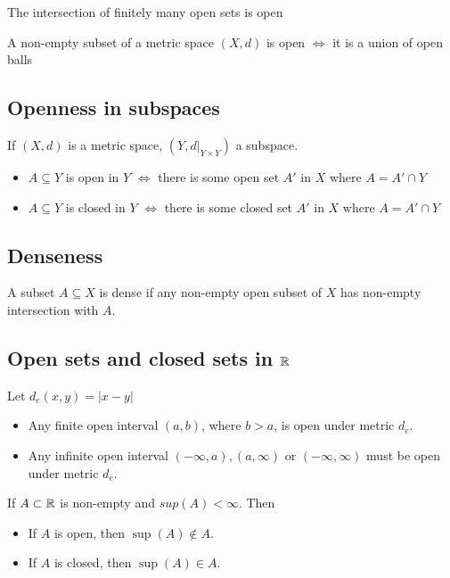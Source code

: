 \begin{theorem}
  The intersection of finitely many open sets is open
\end{theorem}

\begin{theorem}
  A non-empty subset of a metric space $(X, d)$ is open $\iff$ it is
a union of open balls
\end{theorem}

\subsection{Openness in subspaces}

\begin{theorem}
  If $(X, d)$ is a metric space, $(Y, d|_{Y \times Y} )$ a subspace.
  \begin{itemize}
    \item $A \subseteq Y$ is open in $Y$ $\iff$ there is some open set $A'$ in $X$ where $A = A' \cap Y$
    \item $A \subseteq Y$ is closed in $Y$ $\iff$ there is some closed set $A'$ in $X$ where $A = A' \cap Y$
  \end{itemize}
\end{theorem}
\subsection{Denseness}

\begin{definition}
  A subset $A \subseteq X$ is dense if any non-empty open subset of
$X$ has non-empty intersection with $A$.
\end{definition}

\subsection{Open sets and closed sets in $\mathbb R$}

\begin{lemma}
  Let $d_e(x, y) = |x - y|$
  \begin{itemize}
    \item  Any finite open interval $(a, b)$, where $b > a$, is open
    under metric $d_e$.
    \item Any infinite open interval $(-\infty, a), (a, \infty)$ or $(-\infty, \infty)$ must be open under
    metric $d_e$.
  \end{itemize}
\end{lemma}

\begin{theorem}
  If $A \subset \mathbb R$ is non-empty and $sup(A) < \infty$. Then
  \begin{itemize}
    \item If $A$ is open, then $\sup(A) \notin A$.
    \item If $A$ is closed, then $\sup(A) \in A$.
  \end{itemize}
\end{theorem}

